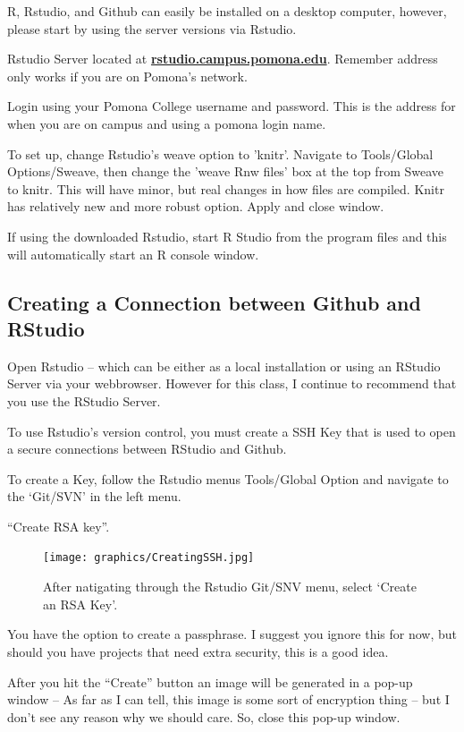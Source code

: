\documentclass[12pt]{../SOP4_alpha}
\begin{document}
\NP R, Rstudio, and Github can easily be installed on a desktop computer, however, please start by using the server versions via Rstudio. 

\NP Rstudio Server located at \href{http://rstudio.campus.pomona.edu}{\textbf{rstudio.campus.pomona.edu}}. Remember address only works if you are on Pomona's network. 

\NP Login using your Pomona College username and password. This is the address for when you are on campus and using a pomona login name. 

\NP To set up, change Rstudio's weave option to 'knitr'. Navigate to Tools/Global Options/Sweave, then change the 'weave Rnw files' box at the top from Sweave to knitr. This will have minor, but real changes in how files are compiled. Knitr has relatively new and more robust option. Apply and close window. 

\NP If using the downloaded Rstudio, start R Studio from the program files and this will automatically start an R console window.

\subsection{Creating a Connection between Github and RStudio}

\NP Open Rstudio -- which can be either as a local installation or using an RStudio Server via your webbrowser. However for this class, I continue to recommend that you use the RStudio Server.

\NP To use Rstudio's version control, you must create a SSH Key that is used to open a secure connections between RStudio and Github.

\NP To create a Key, follow the Rstudio menus Tools/Global Option and navigate to the `Git/SVN' in the left menu.

\NP ``Create RSA key''. 

\begin{figure}
\centering
\texttt{[image: graphics/CreatingSSH.jpg]}
\caption{After natigating through the Rstudio Git/SNV menu, select `Create an RSA Key'.}
\end{figure}

\NP You have the option to create a passphrase. I suggest you ignore this for now, but should you have projects that need extra security, this is a good idea.

\NP After you hit the ``Create'' button an image will be generated in a pop-up window -- As far as I can tell, this image is some sort of encryption thing -- but I don't see any reason why we should care. So, close this pop-up window. 
\end{document}
